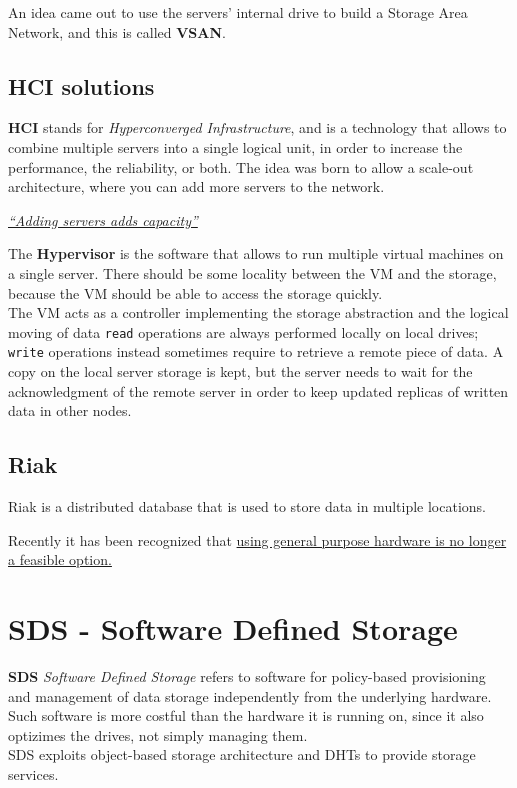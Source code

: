 An idea came out to use the servers' internal drive to build a Storage Area Network, and this is called \textbf{VSAN}.

\subsection{HCI solutions}
\textbf{HCI} stands for \textit{Hyperconverged Infrastructure}, and is a technology that allows to combine multiple servers into a single logical unit, in order to increase the performance, the reliability, or both. 
The idea was born to allow a scale-out architecture, where you can add more servers to the network.

\begin{center}
   \ul{\textit{``Adding servers adds capacity''}}
\end{center}

The \textbf{Hypervisor} is the software that allows to run multiple virtual machines on a single server. There should be some locality between the VM and the storage, because the VM should be able to access the storage quickly.\\
The VM acts as a controller implementing the storage abstraction and the logical moving of data
\texttt{read} operations are always performed locally on local drives; \texttt{write} operations instead sometimes require to retrieve a remote piece of data.
A copy on the local server storage is kept, but the server needs to wait for the acknowledgment of the remote server in order to keep updated replicas of written data in other nodes.

\subsection*{Riak}
Riak is a distributed database that is used to store data in multiple locations. 

Recently it has been recognized that \ul{using general purpose hardware is no longer a feasible option.}

\section{SDS - Software Defined Storage}
\textbf{SDS} \textit{Software Defined Storage} refers to software for policy-based provisioning and management of data storage independently from the underlying hardware.
Such software is more costful than the hardware it is running on, since it also optizimes the drives, not simply managing them.\\
SDS exploits object-based storage architecture and DHTs to provide storage services.